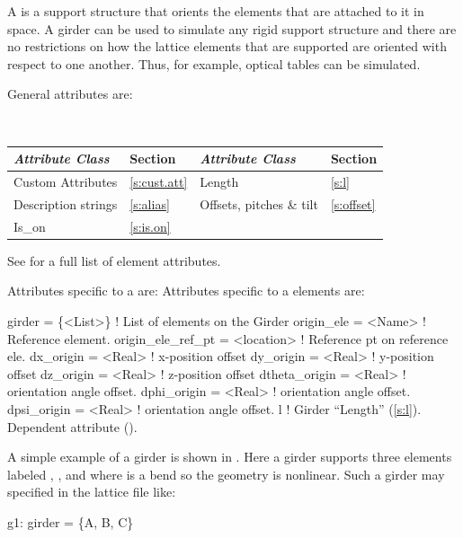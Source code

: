A  is a support structure that orients the elements that
are attached to it in space. A girder can be used to simulate any
rigid support structure and there are no restrictions on how the lattice
elements that are supported are oriented with respect to one another.
Thus, for example, optical tables can be simulated.

General  attributes are:
\begin{center}
\tt
\begin{tabular}{llll} \toprule
  {\sl Attribute Class}      & Section           & {\sl Attribute Class}      & Section         \\ \midrule
  Custom Attributes          & \ref{s:cust.att}  & Length                     & \ref{s:l}       \\
  Description strings        & \ref{s:alias}     & Offsets, pitches \& tilt   & \ref{s:offset}  \\ 
  Is_on                      & \ref{s:is.on}     &                            &                 \\
  \bottomrule
\end{tabular}
\end{center}
\toffset
See  for a full list of element attributes.

Attributes specific to a  are:
Attributes specific to a  elements are:
\begin{example}
  girder = \{<List>\}   ! List of elements on the Girder
  origin_ele        = <Name>     ! Reference element.
  origin_ele_ref_pt = <location> ! Reference pt on reference ele.
  dx_origin         = <Real>     ! x-position offset
  dy_origin         = <Real>     ! y-position offset
  dz_origin         = <Real>     ! z-position offset
  dtheta_origin     = <Real>     ! orientation angle offset.
  dphi_origin       = <Real>     ! orientation angle offset.
  dpsi_origin       = <Real>     ! orientation angle offset.
  l                 ! Girder ``Length'' (\ref{s:l}). Dependent attribute ().
\end{example}

A simple example of a girder is shown in . Here a girder supports three
elements labeled , , and  where  is a bend so the geometry is
nonlinear. Such a girder may specified in the lattice file like:
\begin{example}
  g1: girder = \{A, B, C\}
\end{example}


